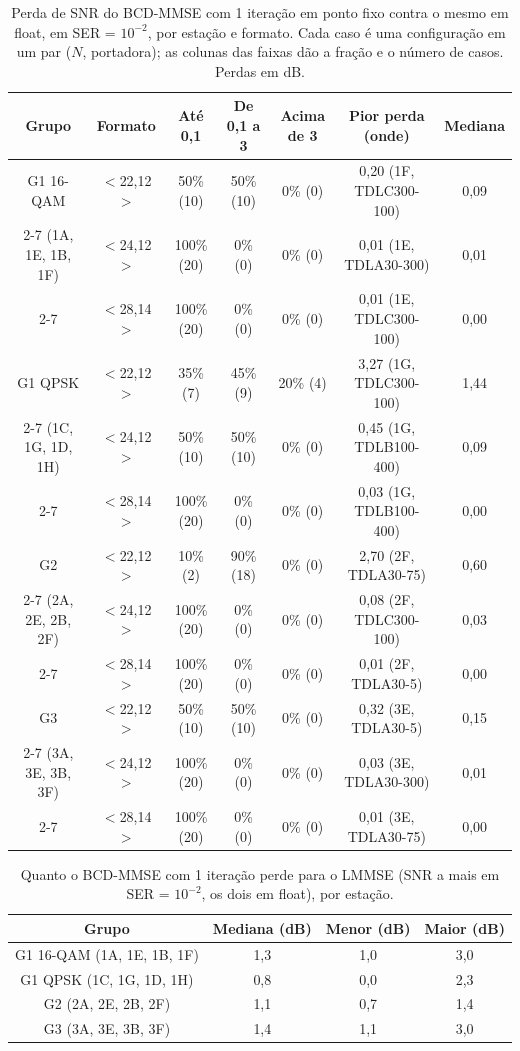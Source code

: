 \begin{table}[htbp]
\caption{Perda de SNR do BCD-MMSE com 1 iteração em ponto fixo contra o mesmo em float, em SER = $10^{-2}$, por estação e formato. Cada caso é uma configuração em um par ($N$, portadora); as colunas das faixas dão a fração e o número de casos. Perdas em dB.}
\label{tab:perfil-perdas}
\centering
\footnotesize
\renewcommand{\arraystretch}{1.2}
\begin{tabular}{|c|c|c|c|c|c|c|}
\hline
Grupo & Formato & Até 0,1 & De 0,1 a 3 & Acima de 3 & Pior perda (onde) & Mediana \\
\hline
G1 16-QAM & $<$22,12$>$ & 50\% (10) & 50\% (10) & 0\% (0) & 0,20 (1F, TDLC300-100) & 0,09 \\
\cline{2-7}
(1A, 1E, 1B, 1F) & $<$24,12$>$ & 100\% (20) & 0\% (0) & 0\% (0) & 0,01 (1E, TDLA30-300) & 0,01 \\
\cline{2-7}
 & $<$28,14$>$ & 100\% (20) & 0\% (0) & 0\% (0) & 0,01 (1E, TDLC300-100) & 0,00 \\
\hline
G1 QPSK & $<$22,12$>$ & 35\% (7) & 45\% (9) & 20\% (4) & 3,27 (1G, TDLC300-100) & 1,44 \\
\cline{2-7}
(1C, 1G, 1D, 1H) & $<$24,12$>$ & 50\% (10) & 50\% (10) & 0\% (0) & 0,45 (1G, TDLB100-400) & 0,09 \\
\cline{2-7}
 & $<$28,14$>$ & 100\% (20) & 0\% (0) & 0\% (0) & 0,03 (1G, TDLB100-400) & 0,00 \\
\hline
G2 & $<$22,12$>$ & 10\% (2) & 90\% (18) & 0\% (0) & 2,70 (2F, TDLA30-75) & 0,60 \\
\cline{2-7}
(2A, 2E, 2B, 2F) & $<$24,12$>$ & 100\% (20) & 0\% (0) & 0\% (0) & 0,08 (2F, TDLC300-100) & 0,03 \\
\cline{2-7}
 & $<$28,14$>$ & 100\% (20) & 0\% (0) & 0\% (0) & 0,01 (2F, TDLA30-5) & 0,00 \\
\hline
G3 & $<$22,12$>$ & 50\% (10) & 50\% (10) & 0\% (0) & 0,32 (3E, TDLA30-5) & 0,15 \\
\cline{2-7}
(3A, 3E, 3B, 3F) & $<$24,12$>$ & 100\% (20) & 0\% (0) & 0\% (0) & 0,03 (3E, TDLA30-300) & 0,01 \\
\cline{2-7}
 & $<$28,14$>$ & 100\% (20) & 0\% (0) & 0\% (0) & 0,01 (3E, TDLA30-75) & 0,00 \\
\hline
\end{tabular}
\end{table}

\begin{table}[htbp]
\caption{Quanto o BCD-MMSE com 1 iteração perde para o LMMSE (SNR a mais em SER = $10^{-2}$, os dois em float), por estação.}
\label{tab:perfil-bcd-lmmse}
\centering
\footnotesize
\renewcommand{\arraystretch}{1.2}
\begin{tabular}{|c|c|c|c|}
\hline
Grupo & Mediana (dB) & Menor (dB) & Maior (dB) \\
\hline
G1 16-QAM (1A, 1E, 1B, 1F) & 1,3 & 1,0 & 3,0 \\
\hline
G1 QPSK (1C, 1G, 1D, 1H) & 0,8 & 0,0 & 2,3 \\
\hline
G2 (2A, 2E, 2B, 2F) & 1,1 & 0,7 & 1,4 \\
\hline
G3 (3A, 3E, 3B, 3F) & 1,4 & 1,1 & 3,0 \\
\hline
\end{tabular}
\end{table}
